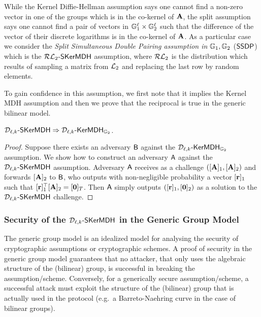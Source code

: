 While the Kernel Diffie-Hellman assumption says one cannot find a non-zero vector in one of the groups which is in the co-kernel of $\mathbf{{A}}$, the split assumption says one cannot find a pair of vectors in $\mathbb{G}_1^{\ell} \times \mathbb{G}_2^{\ell}$ such that the difference of the vector of their discrete logarithms is in the co-kernel of $\mathbf{{A}}$. 
As a particular case we consider the \emph{Split Simultaneous Double Pairing assumption in} $\mathbb{G}_1,\mathbb{G}_2$ ($\mathsf{SSDP}$) which is the $\mathcal{RL}_{2}\mbox{-}\mathsf{SKerMDH}$ assumption, where 
$\mathcal{RL}_{2}$ is the distribution which results of sampling a matrix from $\mathcal{L}_{2}$ and replacing the last row by random elements. 

To gain confidence in this assumption, we first note that it implies the Kernel MDH assumption and then we prove that the reciprocal is true in the generic bilinear model. 

\begin{lemma} $\mathcal{D}_{\ell,k}\mbox{-}\mathsf{SKerMDH} \Rightarrow \mathcal{D}_{\ell,k}\mbox{-}\mathsf{KerMDH}_{\mathbb{G}_2}$.
\end{lemma}
\begin{proof} Suppose there exists an adversary $\mathsf{B}$ against the 
$\mathcal{D}_{\ell,k}\mbox{-}\mathsf{KerMDH}_{\mathbb{G}_2}$ assumption. We show how to construct an adversary $\mathsf{A}$ against the  $\mathcal{D}_{\ell,k}\mbox{-}\mathsf{SKerMDH}$ assumption. Adversary $\mathsf{A}$ receives as a challenge $([\mathbf{{A}}]_1,[\mathbf{{A}}]_2)$ and forwards $[\mathbf{{A}}]_2$ to $\mathsf{B}$, who outputs with non-negligible probability a vector $[\mathbf{r}]_1$ such that $[\mathbf{r}]_1^{\top} [\mathbf{{A}}]_2=[\mathbf{0}]_{T}$. Then $\mathsf{A}$  simply outputs $([\mathbf{r}]_1,[\mathbf{0}]_2)$ as a solution to the $\mathcal{D}_{\ell,k}\mbox{-}\mathsf{SKerMDH}$ challenge. 
\end{proof}

\subsubsection{Security of the $\mathcal{D}_{\ell,k}\mbox{-}\mathsf{SKerMDH}$ in the Generic Group Model}

The generic group model is an idealized model for analysing the security of cryptographic assumptions or cryptographic schemes. A proof of security in the generic group model guarantees that no attacker, that only uses the algebraic structure of the (bilinear) group, is successful in breaking the assumption/scheme. Conversely, for a generically secure assumption/scheme, a successful attack must exploit the structure of the (bilinear) group that is actually used in the protocol (e.g.~a Barreto-Naehring curve in the case of bilinear groups).  

